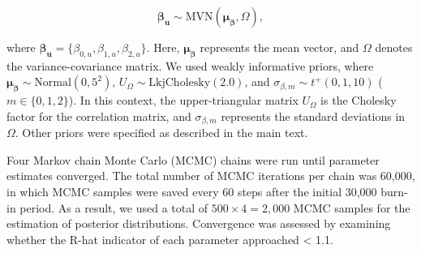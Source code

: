 \documentclass[11pt, class=article, crop=false]{standalone}
\theoremstyle{definition}
\begin{document}
\begin{equation}
    \boldsymbol{\beta_u} \sim \mbox{MVN}(\boldsymbol{\mu_{\beta}}, \Omega),
\end{equation}

where $\boldsymbol{\beta_u} = \{\beta_{0, u}, \beta_{1, u}, \beta_{2, u}\}$. Here, $\boldsymbol{\mu_{\beta}}$ represents the mean vector, and $\Omega$ denotes the variance-covariance matrix.
We used weakly informative priors, where $\boldsymbol{\mu_{\beta}} \sim \mbox{Normal}(0, 5^2)$, $U_{\Omega} \sim \mbox{LkjCholesky}(2.0)$, and $\sigma_{\beta, m} \sim t^+(0, 1, 10)$ ($m \in \{0, 1, 2\}$). In this context, the upper-triangular matrix $U_{\Omega}$ is the Cholesky factor for the correlation matrix, and $\sigma_{\beta, m}$ represents the standard deviations in $\Omega$.
Other priors were specified as described in the main text.

Four Markov chain Monte Carlo (MCMC) chains were run until parameter estimates
converged.
The total number of MCMC iterations per chain was 60,000, in which MCMC samples were saved every 60 steps after the initial 30,000 burn-in period.
As a result, we used a total of $500 \times 4 = 2,000$ MCMC samples for the estimation of posterior distributions.
Convergence was assessed by examining whether the R-hat indicator of each parameter approached < 1.1.


\end{document}
